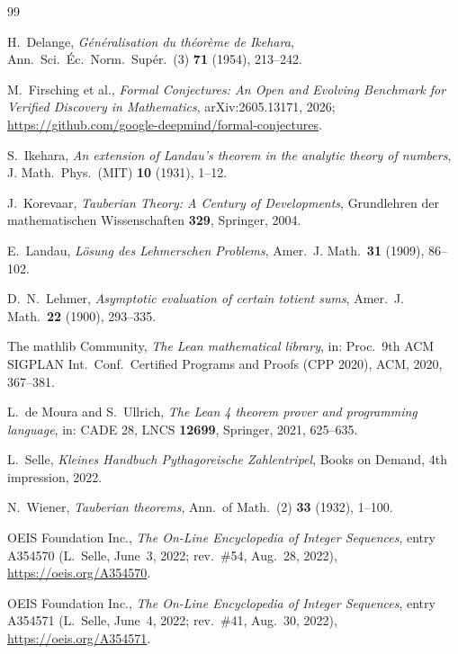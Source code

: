 \documentclass[11pt]{amsart}
\theoremstyle{plain}
\theoremstyle{definition}
\begin{document}
{\footnotesize
\begin{thebibliography}{99}

H.~Delange, \emph{G\'en\'eralisation du th\'eor\`eme de Ikehara}, Ann.\ Sci.\ \'Ec.\ Norm.\ Sup\'er.\ (3) \textbf{71} (1954), 213--242.

M.~Firsching et al., \emph{Formal Conjectures: An Open and Evolving Benchmark for Verified Discovery in Mathematics}, arXiv:2605.13171, 2026; \url{https://github.com/google-deepmind/formal-conjectures}.

S.~Ikehara, \emph{An extension of Landau's theorem in the analytic theory of numbers}, J. Math.\ Phys.\ (MIT) \textbf{10} (1931), 1--12.

J.~Korevaar, \emph{Tauberian Theory: A Century of Developments}, Grundlehren der mathematischen Wissenschaften \textbf{329}, Springer, 2004.

E.~Landau, \emph{L\"osung des Lehmerschen Problems}, Amer.\ J. Math.\ \textbf{31} (1909), 86--102.

D.~N.~Lehmer, \emph{Asymptotic evaluation of certain totient sums}, Amer.\ J. Math.\ \textbf{22} (1900), 293--335.

The mathlib Community, \emph{The Lean mathematical library}, in: Proc.\ 9th ACM SIGPLAN Int.\ Conf.\ Certified Programs and Proofs (CPP 2020), ACM, 2020, 367--381.

L.~de Moura and S.~Ullrich, \emph{The Lean 4 theorem prover and programming language}, in: CADE 28, LNCS \textbf{12699}, Springer, 2021, 625--635.

L.~Selle, \emph{Kleines Handbuch Pythagoreische Zahlentripel}, Books on Demand, 4th impression, 2022.

N.~Wiener, \emph{Tauberian theorems}, Ann.\ of Math.\ (2) \textbf{33} (1932), 1--100.

OEIS Foundation Inc., \emph{The On-Line Encyclopedia of Integer Sequences}, entry A354570 (L.~Selle, June~3, 2022; rev.~\#54, Aug.~28, 2022), \url{https://oeis.org/A354570}.

OEIS Foundation Inc., \emph{The On-Line Encyclopedia of Integer Sequences}, entry A354571 (L.~Selle, June~4, 2022; rev.~\#41, Aug.~30, 2022), \url{https://oeis.org/A354571}.

\end{thebibliography}
}
\end{document}
